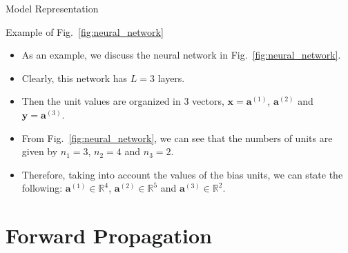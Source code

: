 \documentclass[8pt,american]{beamer}
\begin{document}
\begin{frame}{Model Representation}

\begin{block}{Example of Fig.~\ref{fig:neural_network}}
\begin{itemize}
\justifying
\item As an example, we discuss the neural network in
  Fig.~\ref{fig:neural_network}.
\item Clearly, this network has $L=3$ layers.
\item Then the unit values are organized in 3 vectors,
  $\mathbf{x}=\mathbf{a}^{\left(1\right)}$, $\mathbf{a}^{\left(2\right)}$ and
  $\mathbf{y}=\mathbf{a}^{\left(3\right)}$.
\item From Fig.~\ref{fig:neural_network}, we can see that the numbers of units
  are given by $n_{1}=3$, $n_{2}=4$ and $n_{3}=2$.
\item Therefore, taking into account the values of the bias units, we can state
  the following: $\mathbf{a}^{\left(1\right)}\in\mathbb{R}^{4}$,
  $\mathbf{a}^{\left(2\right)}\in\mathbb{R}^{5}$ and
  $\mathbf{a}^{\left(3\right)}\in\mathbb{R}^{2}$.
\end{itemize}
\end{block}

\end{frame}

\section[]{Forward Propagation}
\end{document}
